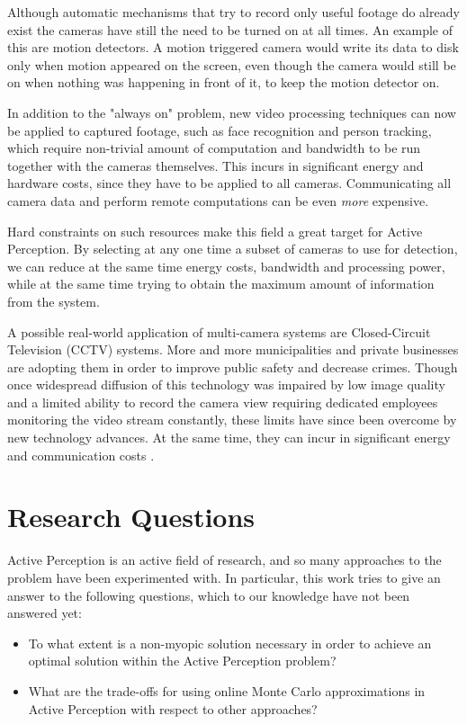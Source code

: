 Although automatic mechanisms that try to record only useful footage do already exist the cameras
have still the need to be turned on at all times. An example of this are motion detectors. A motion
triggered camera would write its data to disk only when motion appeared on the screen, even though
the camera would still be on when nothing was happening in front of it, to keep the motion detector
on.

In addition to the "always on" problem, new video processing techniques can now be applied to
captured footage, such as face recognition and person tracking, which require non-trivial amount of
computation and bandwidth to be run together with the cameras themselves. This incurs in significant
energy and hardware costs, since they have to be applied to all cameras. Communicating all camera
data and perform remote computations can be even \textit{more} expensive.

Hard constraints on such resources make this field a great target for Active Perception. By
selecting at any one time a subset of cameras to use for detection, we can reduce at the same time
energy costs, bandwidth and processing power, while at the same time trying to obtain the maximum
amount of information from the system.

A possible real-world application of multi-camera systems are Closed-Circuit Television (CCTV)
systems. More and more municipalities and private businesses are adopting them in order to improve
public safety and decrease crimes\cite{cit:cctv}. Though once widespread diffusion of this
technology was impaired by low image quality and a limited ability to record the camera view
requiring dedicated employees monitoring the video stream constantly, these limits have since been
overcome by new technology advances. At the same time, they can incur in significant energy and
communication costs \cite{cit:cctvenergy}.

\section{Research Questions}

Active Perception is an active field of research, and so many approaches to the problem have been
experimented with. In particular, this work tries to give an answer to the following questions,
which to our knowledge have not been answered yet:

\begin{itemize}
\item To what extent is a non-myopic solution necessary in order to achieve an optimal solution
within the Active Perception problem?
\item What are the trade-offs for using online Monte Carlo approximations in Active Perception with
respect to other approaches?
\end{itemize}

